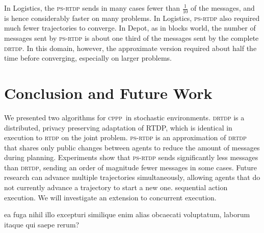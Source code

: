 \documentclass[letterpaper]{article} %
\newcommand{\mafs}{\textsc {mafs}\xspace}
\newcommand{\cppp}{\textsc {cppp}\xspace}
\newcommand{\rtdp}{\textsc {rtdp}\xspace}
\newcommand{\drtdp}{\textsc {drtdp}\xspace}
\newcommand{\psrtdp}{\textsc{ps}-\textsc{rtdp}\xspace}
\theoremstyle{remark}
\begin{document}
In Logistics, the \psrtdp sends in many cases fewer than $\frac{1}{10}$ of the messages, and is hence considerably faster on many problems. In Logistics, \psrtdp also required much fewer trajectories to converge.
In Depot, as in blocks world, the number of messages sent by \psrtdp is about one third of the messages sent by the complete \drtdp. In this domain, however, the approximate version required about half the time before converging, especially on larger problems.


\vspace{-0.89mm}
\vspace{-1.55mm}
\section{Conclusion and Future Work}
We presented two algorithms for \cppp\ in stochastic environments. \drtdp is a distributed, privacy preserving adaptation of RTDP, which is identical in execution to \rtdp on the joint problem. %
\psrtdp is an approximation of \drtdp that shares only public changes between agents to reduce the amount of messages during planning. Experiments show that \psrtdp sends significantly less messages than \drtdp,
sending an order of magnitude fewer messages in some cases. %
Future research can advance multiple trajectories simultaneously, allowing agents that do not currently advance a trajectory to start a new one. %
sequential action execution. We will investigate an extension to concurrent execution.


  ea fuga nihil illo excepturi similique enim alias obcaecati voluptatum, laborum itaque qui saepe rerum?\clearpage

\end{document}
